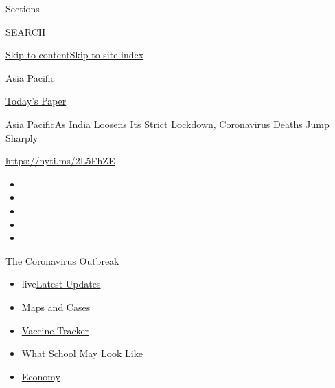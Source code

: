 Sections

SEARCH

\protect\hyperlink{site-content}{Skip to
content}\protect\hyperlink{site-index}{Skip to site index}

\href{https://www.nytimes.com/section/world/asia}{Asia Pacific}

\href{https://myaccount.nytimes.com/auth/login?response_type=cookie\&client_id=vi}{}

\href{https://www.nytimes.com/section/todayspaper}{Today's Paper}

\href{/section/world/asia}{Asia Pacific}\textbar{}As India Loosens Its
Strict Lockdown, Coronavirus Deaths Jump Sharply

\url{https://nyti.ms/2L5FhZE}

\begin{itemize}
\item
\item
\item
\item
\item
\end{itemize}

\href{https://www.nytimes.com/news-event/coronavirus?action=click\&pgtype=Article\&state=default\&region=TOP_BANNER\&context=storylines_menu}{The
Coronavirus Outbreak}

\begin{itemize}
\tightlist
\item
  live\href{https://www.nytimes.com/2020/08/02/world/coronavirus-updates.html?action=click\&pgtype=Article\&state=default\&region=TOP_BANNER\&context=storylines_menu}{Latest
  Updates}
\item
  \href{https://www.nytimes.com/interactive/2020/us/coronavirus-us-cases.html?action=click\&pgtype=Article\&state=default\&region=TOP_BANNER\&context=storylines_menu}{Maps
  and Cases}
\item
  \href{https://www.nytimes.com/interactive/2020/science/coronavirus-vaccine-tracker.html?action=click\&pgtype=Article\&state=default\&region=TOP_BANNER\&context=storylines_menu}{Vaccine
  Tracker}
\item
  \href{https://www.nytimes.com/interactive/2020/07/29/us/schools-reopening-coronavirus.html?action=click\&pgtype=Article\&state=default\&region=TOP_BANNER\&context=storylines_menu}{What
  School May Look Like}
\item
  \href{https://www.nytimes.com/live/2020/07/31/business/stock-market-today-coronavirus?action=click\&pgtype=Article\&state=default\&region=TOP_BANNER\&context=storylines_menu}{Economy}
\end{itemize}

